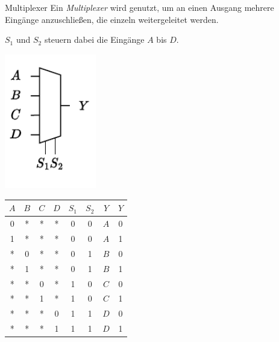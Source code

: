 \begin{defi}{Multiplexer}
    Ein \emph{Multiplexer} wird genutzt, um an einen Ausgang mehrere Eingänge anzuschließen, die einzeln weitergeleitet werden.

    $S_1$ und $S_2$ steuern dabei die Eingänge $A$ bis $D$.

    \begin{minipage}{0.5\textwidth}
        \begin{center}
            \includegraphics[width=0.3\textwidth]{includes/figures/defi_multiplexer.pdf}
        \end{center}
    \end{minipage}
    \begin{minipage}{0.5\textwidth}
        \begin{center}
            \begin{tabular}{|c|c|c|c|c|c||c|c|}
                \hline
                $A$ & $B$ & $C$ & $D$ & $S_1$ & $S_2$ & $Y$ & $Y$ \\\hline\hline
                0   & *   & *   & *   & 0     & 0     & $A$ & 0   \\\hline
                1   & *   & *   & *   & 0     & 0     & $A$ & 1   \\\hline
                *   & 0   & *   & *   & 0     & 1     & $B$ & 0   \\\hline
                *   & 1   & *   & *   & 0     & 1     & $B$ & 1   \\\hline
                *   & *   & 0   & *   & 1     & 0     & $C$ & 0   \\\hline
                *   & *   & 1   & *   & 1     & 0     & $C$ & 1   \\\hline
                *   & *   & *   & 0   & 1     & 1     & $D$ & 0   \\\hline
                *   & *   & *   & 1   & 1     & 1     & $D$ & 1   \\\hline
            \end{tabular}
        \end{center}
    \end{minipage}
\end{defi}

